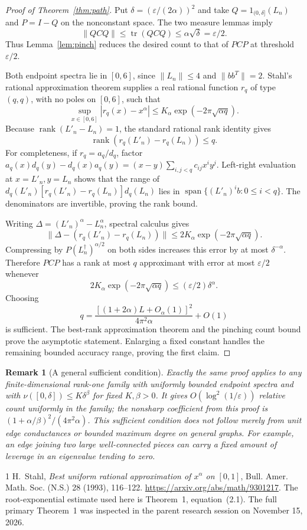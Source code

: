 \documentclass[11pt]{article}
\newtheorem{remark}{Remark}
\newcommand{\tr}{\operatorname{tr}}
\newcommand{\rank}{\operatorname{rank}}
\begin{document}
\begin{proof}[Proof of Theorem~\ref{thm:path}]
Put $\delta=(\varepsilon/(2\alpha))^2$ and take
$Q=1_{(0,\delta]}(L_n)$ and $P=I-Q$ on the nonconstant space.
The two measure lemmas imply
\[
 \|QCQ\|\le\tr(QCQ)\le\alpha\sqrt\delta=\varepsilon/2.
\]
Thus Lemma~\ref{lem:pinch} reduces the desired count to that of $PCP$
at threshold $\varepsilon/2$.

Both endpoint spectra lie in $[0,6]$, since $\|L_n\|\le4$ and
$\|bb^T\|=2$. Stahl's rational approximation theorem supplies a real
rational function $r_q$ of type $(q,q)$, with no poles on $[0,6]$, such
that
\[
 \sup_{x\in[0,6]}|r_q(x)-x^\alpha|
 \le K_\alpha\exp(-2\pi\sqrt{\alpha q}).
\]
Because $\rank(L'_n-L_n)=1$, the standard rational rank identity gives
\[
 \rank(r_q(L'_n)-r_q(L_n))\le q.
\]
For completeness, if $r_q=a_q/d_q$, factor
$a_q(x)d_q(y)-d_q(x)a_q(y)=(x-y)\sum_{i,j<q}c_{ij}x^iy^j$.
Left-right evaluation at $x=L'_n,y=L_n$ shows that the range of
$d_q(L'_n)[r_q(L'_n)-r_q(L_n)]d_q(L_n)$ lies in
$\operatorname{span}\{(L'_n)^ib:0\le i<q\}$.
The denominators are invertible, proving the rank bound.

Writing $\Delta=(L'_n)^\alpha-L_n^\alpha$, spectral calculus gives
\[
 \|\Delta-(r_q(L'_n)-r_q(L_n))\|
 \le2K_\alpha\exp(-2\pi\sqrt{\alpha q}).
\]
Compressing by $P(L_n^\dagger)^{\alpha/2}$ on both sides increases
this error by at most $\delta^{-\alpha}$. Therefore $PCP$ has a rank
at most $q$ approximant with error at most $\varepsilon/2$ whenever
\[
 2K_\alpha\exp(-2\pi\sqrt{\alpha q})
       \le(\varepsilon/2)\delta^\alpha.
\]
Choosing
\[
 q=\frac{[(1+2\alpha)L+O_\alpha(1)]^2}{4\pi^2\alpha}+O(1)
\]
is sufficient. The best-rank approximation theorem and the pinching
count bound prove the asymptotic statement. Enlarging a fixed constant
handles the remaining bounded accuracy range, proving the first claim.
\end{proof}

\begin{remark}[A general sufficient condition]
Exactly the same proof applies to any finite-dimensional rank-one
family with uniformly bounded endpoint spectra and with
$\nu([0,\delta])\le K\delta^\beta$ for fixed $K,\beta>0$.
It gives $O(\log^2(1/\varepsilon))$ relative count uniformly in the
family; the nonsharp coefficient from this proof is
$(1+\alpha/\beta)^2/(4\pi^2\alpha)$.
This sufficient condition does not follow merely from unit edge
conductances or bounded maximum degree on general graphs. For example,
an edge joining two large well-connected pieces can carry a fixed
amount of leverage in an eigenvalue tending to zero.
\end{remark}

\begin{thebibliography}{1}
H.~Stahl, \emph{Best uniform rational approximation of $x^\alpha$ on
$[0,1]$}, Bull. Amer. Math. Soc. (N.S.) 28 (1993), 116--122.
\url{https://arxiv.org/abs/math/9301217}.
The root-exponential estimate used here is Theorem~1, equation~(2.1).
The full primary Theorem~1 was inspected in the parent research session
on November 15, 2026.
\end{thebibliography}
\end{document}
